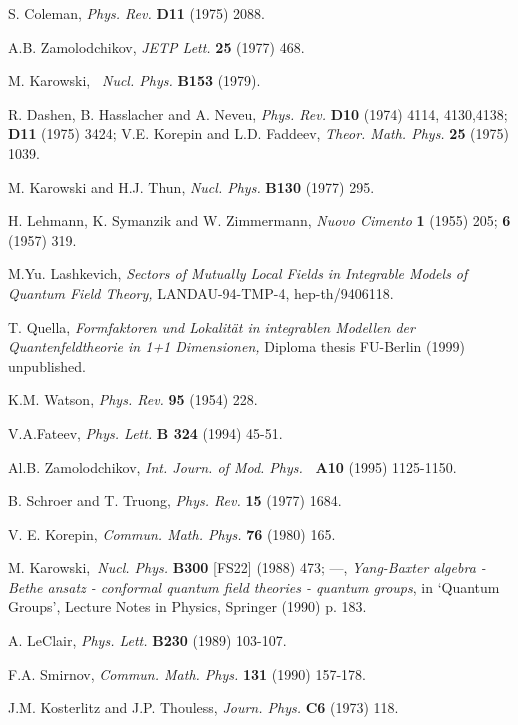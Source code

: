 \documentclass[a4paper,12pt]{article}
\begin{document}
\begin{thebibliography}{99}
  S. Coleman, \emph{Phys. Rev.} {\bf D11} (1975) 2088.

  A.B. Zamolodchikov, \emph{JETP Lett.} \textbf{25} (1977) 468.

  M. Karowski, \emph{\ Nucl. Phys.} \textbf{B153} (1979).

  R. Dashen, B. Hasslacher and A. Neveu, \emph{Phys. Rev.} 
\textbf{D10} (1974) 4114, 4130,4138; \textbf{D11} (1975) 3424;\newline
V.E. Korepin and L.D. Faddeev, \emph{Theor. Math. Phys.} \textbf{25} (1975)
1039.

  M. Karowski and H.J. Thun, \emph{Nucl. Phys.} \textbf{B130}
(1977) 295.

  H. Lehmann, K. Symanzik and W. Zimmermann, {\em Nuovo Cimento} 
\textbf{1} (1955) 205; \textbf{6} (1957) 319.

  M.Yu. Lashkevich, \emph{Sectors of Mutually Local Fields in
Integrable Models of Quantum Field Theory, }LANDAU-94-TMP-4, hep-th/9406118.

  T. Quella, \emph{Formfaktoren und Lokalit\"{a}t in integrablen
Modellen der Quan\-ten\-feld\-theo\-rie in 1+1 Dimensionen,} Diploma thesis
FU-Berlin (1999) unpublished.

  K.M. Watson, \emph{Phys. Rev.} \textbf{95} (1954) 228.

  V.A.Fateev, {\em Phys. Lett.} {\bf B 324} (1994) 45-51.

  Al.B. Zamolodchikov, \emph{Int. Journ. of Mod. Phys.}\textbf{%
\ A10} (1995) 1125-1150.

  B. Schroer and T. Truong, \emph{Phys. Rev.} \textbf{15} (1977)
1684.

  V. E. Korepin, \emph{Commun. Math. Phys.} \textbf{76} (1980)
165.

  M. Karowski,\emph{\ Nucl. Phys.} \textbf{B300} [FS22] (1988)
473; \newline
---, \emph{Yang-Baxter algebra - Bethe ansatz - conformal quantum field
theories - quantum groups}, in `Quantum Groups', Lecture Notes in Physics,
Springer (1990) p. 183.

  A. LeClair, \emph{Phys. Lett. }\textbf{B230} (1989) 103-107.

  F.A. Smirnov, \emph{Commun. Math. Phys. }\textbf{131} (1990)
157-178.

  J.M. Kosterlitz and J.P. Thouless, \emph{Journ. Phys. }\textbf{%
C6} (1973) 118.
\end{thebibliography}
\end{document}
